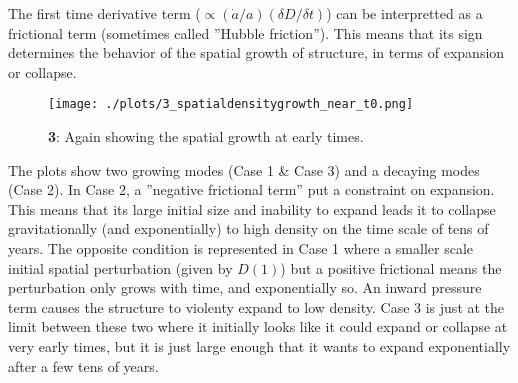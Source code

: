 The first time derivative term ($\propto (\dot{a}/a)(\delta D /\delta t)$) can be interpretted as a frictional term (sometimes called ''Hubble friction''). This means that its sign determines the behavior of the spatial growth of structure, in terms of expansion or collapse.


\begin{figure}[h!]
  \centering
  \texttt{[image: ./plots/3\_spatialdensitygrowth\_near\_t0.png]}
  \caption{\textbf{3}: Again showing the spatial growth at early times.}
  \label{fig:spatialdensitygrowtht0}
\end{figure}


The plots show two growing modes (Case 1 \& Case 3) and a decaying modes (Case 2). In Case 2, a ''negative frictional term'' put a constraint on expansion. This means that its large initial size and inability to expand leads it to collapse gravitationally (and exponentially) to high density on the time scale of tens of years. The opposite condition is represented in Case 1 where a smaller scale initial spatial perturbation (given by $D(1)$) but a positive frictional means the perturbation only grows with time, and exponentially so. An inward pressure term causes the structure to violenty expand to low density. Case 3 is just at the limit between these two where it initially looks like it could expand or collapse at very early times, but it is just large enough that it wants to expand exponentially after a few tens of years.

